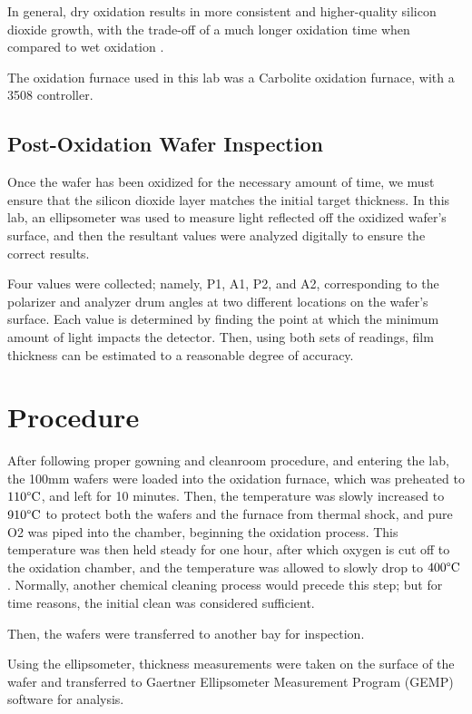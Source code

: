 \documentclass[12pt]{report}
\begin{document}
In general, dry oxidation results in more consistent and higher-quality silicon dioxide growth, with the trade-off of a much longer oxidation time when compared to wet oxidation \cite{dry-wet}.

The oxidation furnace used in this lab was a Carbolite oxidation furnace, with a 3508 controller.

\subsection{Post-Oxidation Wafer Inspection}

Once the wafer has been oxidized for the necessary amount of time, we must ensure that the silicon dioxide layer matches the initial target thickness. In this lab, an ellipsometer was used to measure light reflected off the oxidized wafer's surface, and then the resultant values were analyzed digitally to ensure the correct results.

Four values were collected; namely, P1, A1, P2, and A2, corresponding to the polarizer and analyzer drum angles at two different locations on the wafer's surface. Each value is determined by finding the point at which the minimum amount of light impacts the detector. Then, using both sets of readings, film thickness can be estimated to a reasonable degree of accuracy.

\section{Procedure}

After following proper gowning and cleanroom procedure, and entering the lab, the 100mm wafers were loaded into the oxidation furnace, which was preheated to \(110 \degree \mathrm{C}\), and left for 10 minutes. Then, the temperature was slowly increased to \(910 \degree \mathrm{C}\) to protect both the wafers and the furnace from thermal shock, and pure O2 was piped into the chamber, beginning the oxidation process. This temperature was then held steady for one hour, after which oxygen is cut off to the oxidation chamber, and the temperature was allowed to slowly drop to \(400 \degree \mathrm{C}\). Normally, another chemical cleaning process would precede this step; but for time reasons, the initial clean was considered sufficient.

Then, the wafers were transferred to another bay for inspection. 

Using the ellipsometer, thickness measurements were taken on the surface of the wafer and transferred to Gaertner Ellipsometer Measurement Program (GEMP) software for analysis.
\end{document}
